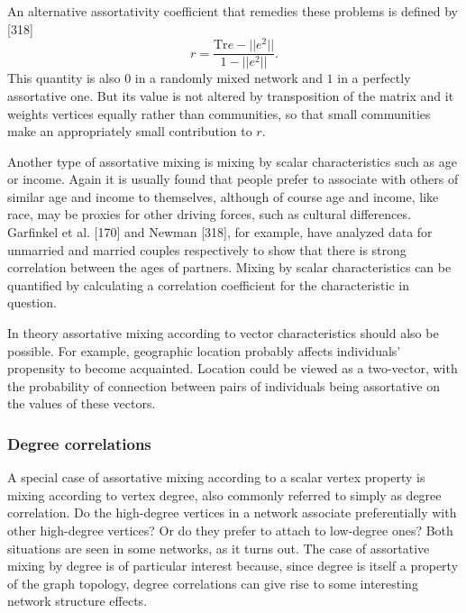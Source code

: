       An alternative assortativity coefficient that remedies these problems is defined by [318]
      $$r = \frac{\mbox{Tr}e - ||e^2||}{1 - ||e^2||}\mbox{.}$$
      This quantity is also $0$ in a randomly mixed network and $1$ in a perfectly assortative one. But its value is not altered by transposition of the matrix and it weights vertices equally rather than communities, so that small communities make an appropriately small contribution to $r$.
      
      Another type of assortative mixing is mixing by scalar characteristics such as age or income. Again it is usually found that people prefer to associate with others of similar age and income to themselves, although of course age and income, like race, may be proxies for other driving forces, such as cultural differences. Garfinkel et al. [170] and Newman [318], for example, have analyzed data for unmarried and married couples respectively to show that there is strong correlation between the ages of partners. Mixing by scalar characteristics can be quantified by calculating a correlation coefficient for the characteristic in question.
      
      In theory assortative mixing according to vector characteristics should also be possible. For example, geographic location probably affects individuals' propensity to become acquainted. Location could be viewed as a two-vector, with the probability of connection between pairs of individuals being assortative on the values of these vectors.
            
    \subsubsection{Degree correlations}
    
      A special case of assortative mixing according to a scalar vertex property is mixing according to vertex degree, also commonly referred to simply as degree correlation. Do the high-degree vertices in a network associate preferentially with other high-degree vertices? Or do they prefer to attach to low-degree ones? Both situations are seen in some networks, as it turns out. The case of assortative mixing by degree is of particular interest because, since degree is itself a property of the graph topology, degree correlations can give rise to some interesting network structure effects.
      
